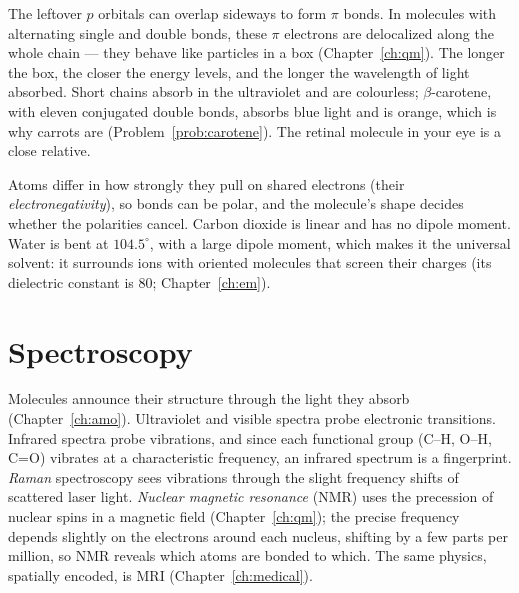 The leftover $p$ orbitals can overlap sideways to form $\pi$ bonds. In molecules with alternating single and double bonds, these $\pi$ electrons are delocalized along the whole chain --- they behave like particles in a box (Chapter~\ref{ch:qm}). The longer the box, the closer the energy levels, and the longer the wavelength of light absorbed. Short chains absorb in the ultraviolet and are colourless; $\beta$-carotene, with eleven conjugated double bonds, absorbs blue light and is orange, which is why carrots are (Problem~\ref{prob:carotene}). The retinal molecule in your eye is a close relative.

Atoms differ in how strongly they pull on shared electrons (their \emph{electronegativity}), so bonds can be polar, and the molecule's shape decides whether the polarities cancel. Carbon dioxide is linear and has no dipole moment. Water is bent at $104.5^\circ$, with a large dipole moment, which makes it the universal solvent: it surrounds ions with oriented molecules that screen their charges (its dielectric constant is $80$; Chapter~\ref{ch:em}).

\section{Spectroscopy}

Molecules announce their structure through the light they absorb (Chapter~\ref{ch:amo}). Ultraviolet and visible spectra probe electronic transitions. Infrared spectra probe vibrations, and since each functional group (C--H, O--H, C=O) vibrates at a characteristic frequency, an infrared spectrum is a fingerprint. \emph{Raman} spectroscopy sees vibrations through the slight frequency shifts of scattered laser light. \emph{Nuclear magnetic resonance} (NMR) uses the precession of nuclear spins in a magnetic field (Chapter~\ref{ch:qm}); the precise frequency depends slightly on the electrons around each nucleus, shifting by a few parts per million, so NMR reveals which atoms are bonded to which. The same physics, spatially encoded, is MRI (Chapter~\ref{ch:medical}).

